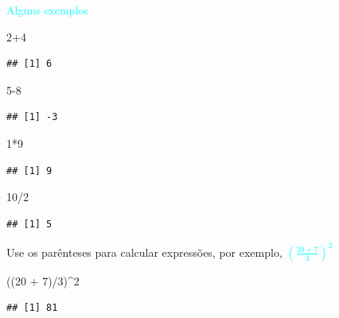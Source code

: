\documentclass[
]{book}
\newenvironment{Shaded}{\begin{snugshade}}{\end{snugshade}}
\newcommand{\DecValTok}[1]{\textcolor[rgb]{0.00,0.00,0.81}{#1}}
\newcommand{\NormalTok}[1]{#1}
\newcommand{\SpecialCharTok}[1]{\textcolor[rgb]{0.00,0.00,0.00}{#1}}
\begin{document}
\textcolor{cyan}{Alguns exemplos}

\begin{Shaded}
\begin{Highlighting}[]
\DecValTok{2}\SpecialCharTok{+}\DecValTok{4}
\end{Highlighting}
\end{Shaded}

\begin{verbatim}
## [1] 6
\end{verbatim}

\begin{Shaded}
\begin{Highlighting}[]
\DecValTok{5{-}8}
\end{Highlighting}
\end{Shaded}

\begin{verbatim}
## [1] -3
\end{verbatim}

\begin{Shaded}
\begin{Highlighting}[]
\DecValTok{1}\SpecialCharTok{*}\DecValTok{9}
\end{Highlighting}
\end{Shaded}

\begin{verbatim}
## [1] 9
\end{verbatim}

\begin{Shaded}
\begin{Highlighting}[]
\DecValTok{10}\SpecialCharTok{/}\DecValTok{2}
\end{Highlighting}
\end{Shaded}

\begin{verbatim}
## [1] 5
\end{verbatim}

Use os parênteses para calcular expressões, por exemplo, \textcolor{cyan}{$\left(\frac{20+7}{3}\right )^2$}

\begin{Shaded}
\begin{Highlighting}[]
\NormalTok{((}\DecValTok{20} \SpecialCharTok{+} \DecValTok{7}\NormalTok{)}\SpecialCharTok{/}\DecValTok{3}\NormalTok{)}\SpecialCharTok{\^{}}\DecValTok{2}
\end{Highlighting}
\end{Shaded}

\begin{verbatim}
## [1] 81
\end{verbatim}
\end{document}
